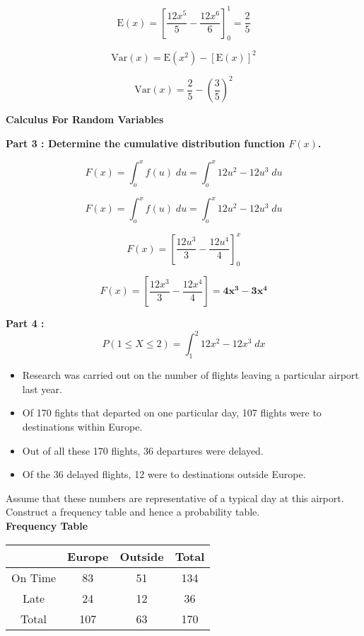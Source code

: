 \documentclass[]{report}
\begin{document}
\[ \mathrm{E}(x)  = \left[\frac{12x^5}{5}-\frac{12x^6}{6} \right]^1_0 = \frac{2}{5} \]



\[ \mathrm{Var}(x) = \mathrm{E}(x^2)  - [\mathrm{E}(x)]^2   \]

\[ \mathrm{Var}(x) = \frac{2}{5}  - \left(\frac{3}{5}\right)^2  \]


\noindent \textbf{Calculus For Random Variables}

\textbf{Part 3 : Determine the cumulative distribution function $F(x)$.}

\[F(x) = \int_o^x f(u) \;du  =  \int_o^x 12u^2-12u^3 \;du\]




\[F(x) = \int_o^x f(u) \;du  =  \int_o^x 12u^2-12u^3 \;du\]

\[ F(x) = \left[\frac{12u^3}{3} - \frac{12u^4}{4} \right]^x_0 \]

\[ F(x) = \left[\frac{12x^3}{3} - \frac{12x^4}{4} \right] = \boldsymbol{ 4x^3 - 3x^4 } \]



\textbf{Part 4 :}
\[P(1 \leq X \leq 2) =  \int_1^2 12x^2-12x^3 \;dx\]





\begin{itemize}
	\item Research was carried out on the number of flights leaving a particular airport last year. 
	
	\item Of 170 fights that departed on one particular day, 107 flights were to destinations within Europe. 
	\item Out of all these 170 flights, 36 departures were delayed. 
	
	\item Of the 36 delayed flights, 12 were to destinations outside Europe. 
	
	
\end{itemize}




Assume that these numbers are representative of a typical 
day at this airport. Construct a frequency table and hence a probability table.\\ \bigskip
\textbf{Frequency Table}\\ \bigskip
\begin{tabular}{|c|c|c||c|}
	\hline  &  \phantom{sp} Europe \phantom{sp} & \phantom{sp} Outside \phantom{sp} &\phantom{sp} Total\phantom{sp}  \\ 
	\hline On Time  & 83 & 51 & 134 \\ 
	\hline Late & 24 & 12 & 36 \\ \hline
	\hline Total  & 107 & 63  & 170  \\ 
	\hline 
\end{tabular} 
\end{document}
